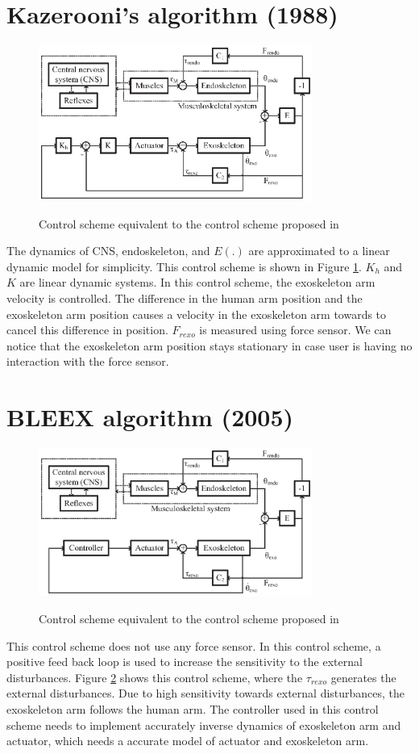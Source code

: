 \documentclass{article}
\begin{document}
\section{Kazerooni's algorithm (1988) \cite{SGadi:Kazerooni88}}
\begin{figure}
  \centering
  \includegraphics[width=09cm]{images/Kazerooni_BD.eps}\\
  \caption{Control scheme equivalent to the control scheme proposed in \cite{SGadi:Kazerooni88}}\label{Fig:Kazerooni_BD}
\end{figure}
The dynamics of CNS, endoskeleton, and $E(.)$ are approximated to a linear dynamic model for simplicity. This control scheme is shown in Figure \ref{Fig:Kazerooni_BD}. $K_h$ and $K$ are linear dynamic systems. In this control scheme, the exoskeleton arm velocity is controlled. The difference in the human arm position and the exoskeleton arm position causes a velocity in the exoskeleton arm towards to cancel this difference in position. $F_{rexo}$ is measured using force sensor. We can notice that the exoskeleton arm position stays stationary in case user is having no interaction with the force sensor.
\section{BLEEX algorithm (2005) \cite{kazerooni2005control}}
\begin{figure}
  \centering
  \includegraphics[width=09cm]{images/BLEEX_BD.eps}\\
  \caption{Control scheme equivalent to the control scheme proposed in \cite{kazerooni2005control}}\label{Fig:BLEEX_BD}
\end{figure}
This control scheme does not use any force sensor. In this control scheme, a positive feed back loop is used to increase the sensitivity to the external disturbances. Figure \ref{Fig:BLEEX_BD} shows this control scheme, where the $\tau_{rexo}$ generates the external disturbances. Due to high sensitivity towards external disturbances, the exoskeleton arm follows the human arm. The controller used in this control scheme needs to implement accurately inverse dynamics of exoskeleton arm and actuator, which needs a accurate model of actuator and exoskeleton arm.
\end{document}
